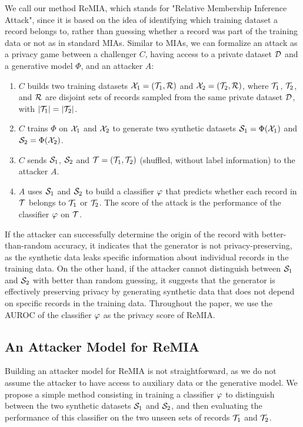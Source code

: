 We call our method ReMIA, which stands for "Relative Membership Inference Attack", since it is based on the idea of identifying which training dataset a record belongs to, rather than guessing whether a record was part of the training data or not as in standard MIAs.
Similar to MIAs, we can formalize an attack as a privacy game between a challenger $C$, having access to a private dataset $\mathcal{D}$ and a generative model $\Phi$, and an attacker $A$:
\begin{enumerate}
    \item $C$ builds two training datasets $\mathcal{X}_1 = (\mathcal{T}_1, \mathcal{R})$ and $\mathcal{X}_2 = (\mathcal{T}_2, \mathcal{R})$, where $\mathcal{T}_1$, $\mathcal{T}_2$, and $\mathcal{R}$ are disjoint sets of records sampled from the same private dataset $\mathcal{D}$, with $|\mathcal{T}_1| = |\mathcal{T}_2|$.
    \item $C$ trains $\Phi$ on $\mathcal{X}_1$ and $\mathcal{X}_2$ to generate two synthetic datasets $\mathcal{S}_1 = \Phi(\mathcal{X}_1)$ and $\mathcal{S}_2 = \Phi(\mathcal{X}_2)$.
    \item $C$ sends $\mathcal{S}_1$, $\mathcal{S}_2$ and $\mathcal{T} = (\mathcal{T}_1, \mathcal{T}_2)$ (shuffled, without label information) to the attacker $A$.
    \item $A$ uses $\mathcal{S}_1$ and $\mathcal{S}_2$ to build a classifier $\varphi$ that predicts whether each record in $\mathcal{T}$ belongs to $\mathcal{T}_1$ or $\mathcal{T}_2$. The score of the attack is the performance of the classifier $\varphi$ on $\mathcal{T}$.
\end{enumerate}
If the attacker can successfully determine the origin of the record with better-than-random accuracy, it indicates that the generator is not privacy-preserving, as the synthetic data leaks specific information about individual records in the training data.
On the other hand, if the attacker cannot distinguish between $\mathcal{S}_1$ and $\mathcal{S}_2$ with better than random guessing, it suggests that the generator is effectively preserving privacy by generating synthetic data that does not depend on specific records in the training data.
Throughout the paper, we use the AUROC of the classifier $\varphi$ as the privacy score of ReMIA.

\subsection{An Attacker Model for ReMIA}
Building an attacker model for ReMIA is not straightforward, as we do not assume the attacker to have access to auxiliary data or the generative model.
We propose a simple method consisting in training a classifier $\varphi$ to distinguish between the two synthetic datasets $\mathcal{S}_1$ and $\mathcal{S}_2$, and then evaluating the performance of this classifier on the two unseen sets of records $\mathcal{T}_1$ and $\mathcal{T}_2$.

